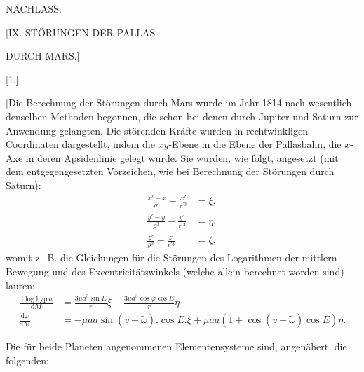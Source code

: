 \clearpage
\begingroup
{}
\renewcommand{\headrulewidth}{0pt}
\clearpage
{}
\begin{center}
\large NACHLASS.
\par\bigskip
\Large [IX. STÖRUNGEN DER PALLAS\par DURCH MARS.]
\par\bigskip
\normalsize [1.]
\end{center}
\begingroup
\small
\makeatletter\tagsleft@true\let\veqno\@@leqno\makeatother
\par\noindent\hspace*{\parindent}[Die Berechnung der Störungen durch Mars wurde im Jahr 1814 nach wesentlich denselben Methoden
begonnen, die schon bei denen durch Jupiter und Saturn zur Anwendung gelangten. Die störenden Kräfte
wurden in rechtwinkligen Coordinaten dargestellt, indem die \(xy\)-Ebene in die Ebene der Pallasbahn, die
\(x\)-Axe in deren Apsidenlinie gelegt wurde. Sie wurden, wie folgt, angesetzt (mit dem entgegengesetzten Vorzeichen,
wie bei Berechnung der Störungen durch Saturn):
\[
\tag*{1)}
\begin{aligned}
\frac{x'-x}{\rho^3}-\frac{x'}{r^{\prime3}}&=\xi,\\[.6em]
\frac{y'-y}{\rho^3}-\frac{y'}{r^{\prime3}}&=\eta,\\[.6em]
\frac{z'}{\rho^3}-\frac{z'}{r^{\prime3}}&=\zeta,
\end{aligned}
\]
womit z.\ B. die Gleichungen für die Störungen des Logarithmen der mittlern Bewegung und des Excentricitätswinkels
(welche allein berechnet worden sind) lauten:
\[
\tag*{2)}
\begin{aligned}
\frac{\mathrm{d}\log\mathrm{hyp}\,n}{\mathrm{d}M}
&=\frac{3\mu a^3\sin E}{r}\xi-\frac{3\mu a^3\cos\varphi\cos E}{r}\eta\\[.6em]
\frac{\mathrm{d}\varphi}{\mathrm{d}M}
&=-\mu aa\sin(v-\tilde\omega)\mathord{.}\cos E\mathord{.}\xi
  +\mu aa(1+\cos(v-\tilde\omega)\cos E)\eta.
\end{aligned}
\]
\par\noindent\hspace*{\parindent}Die für beide Planeten angenommenen Elementensysteme sind, angenähert, die folgenden:
